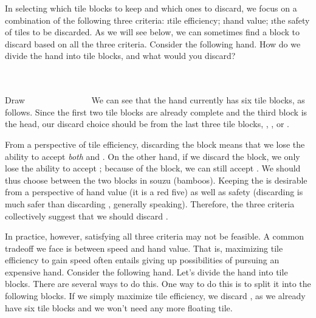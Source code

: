 \bigskip
In selecting which tile blocks to keep and which ones to discard, we focus on a combination of the following three criteria: 
\be
\i tile efficiency;
\i hand value;
\i the safety of tiles to be discarded.
\ee
As we will see below, we can sometimes find a block to discard based on all the three criteria. 
Consider the following hand. How do we divide the hand into tile blocks, and what would you discard?

\bp 
{}\\ \vspace{-16pt}
\rfs{}~\\
\hfill\footnotesize{Draw~~~~~~~~~~~~~~~}
\ep
We can see that the hand currently has six tile blocks, as follows. 
\emj
Since the first two tile blocks are already complete and the third block is the head, our discard choice should be from the last three tile blocks, {\LARGE{}}, {\LARGE{}\rfs}, or {\LARGE{}}. 

\bigskip
From a perspective of tile efficiency, discarding the {\LARGE{}} block means that we lose the ability to accept \emph{both} {\LARGE{}} and {\LARGE{}}. On the other hand, if we discard the {\LARGE{}} block, we only lose the ability to accept {\LARGE{}}; because of the {\LARGE{}\rfs} block, we can still accept {\LARGE{}}. We should thus choose between the two blocks in {\jap souzu} (bamboos). 
Keeping the {\LARGE\rfs} is desirable from a perspective of hand value (it is a red five) as well as safety (discarding {\LARGE{}} is much safer than discarding {\LARGE{}\rfs}, generally speaking). Therefore, the three criteria collectively suggest that we should discard {\LARGE{}}. 

\bigskip

In practice, however, satisfying all three criteria may not be feasible. A common tradeoff we face is between speed and hand value. That is, maximizing tile efficiency to gain speed often entails giving up possibilities of pursuing an expensive hand. Consider the following hand. 
\bp
{}
\ep
Let's divide the hand into tile blocks. There are several ways to do this. One way to do this is to split it into the following blocks. 
\emj
If we simply maximize tile efficiency, we discard {\LARGE{}}, as we already have six tile blocks and we won't need any more floating tile. 


